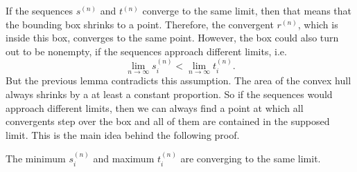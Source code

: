 If the sequences $s^{(n)}$ and $t^{(n)}$ converge to the same limit,
then that means that the bounding box shrinks to a point.
Therefore, the convergent $r^{(n)}$, which is inside this box, converges to the
same point.
However, the box could also turn out to be nonempty,
if the sequences approach different limits, i.e.
\[
  \lim_{n → ∞} s_i^{(n)} < \lim_{n → ∞} t_i^{(n)}.
\]
But the previous lemma contradicts this assumption.
The area of the convex hull always shrinks by a at least a constant proportion.
So if the sequences would approach different limits, then we can always find a
point at which all convergents step over the box and all of them are contained
in the supposed limit.
This is the main idea behind the following proof.

\begin{lemma}
  \label{lem:min-max-conv}
  The minimum $s_i^{(n)}$ and maximum $t_i^{(n)}$ are converging to the same
  limit.
\end{lemma}


